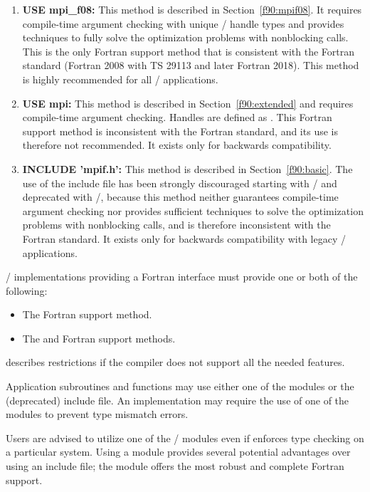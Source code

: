 \begin{enumerate}
\item\textbf{USE mpi\_f08:}
This method is described in Section~\ref{f90:mpif08}.
It requires compile-time argument checking
with unique \MPI/ handle types and provides techniques to fully solve
the optimization problems with nonblocking calls.
This is the only Fortran support method that is consistent with
the Fortran standard (Fortran 2008 with TS 29113 and later Fortran 2018).
This method is highly recommended for all \MPI/ applications.
\item\textbf{USE mpi:}
This method is
described in Section~\ref{f90:extended} and requires
compile-time argument checking. Handles are defined as .
This Fortran support method is inconsistent with the Fortran
standard, and its use is therefore not recommended.
It exists only for backwards compatibility.
\item\textbf{INCLUDE 'mpif.h':}
This method is described in Section~\ref{f90:basic}.
The use of the include file  has been strongly
discouraged starting with \MPIIIIDOTO/ and deprecated with \MPIIVDOTI/, because this method neither guarantees
compile-time argument checking nor provides sufficient techniques to solve
the optimization problems with nonblocking calls,
and is therefore inconsistent with the Fortran standard.
It exists only for backwards compatibility with legacy \MPI/ applications.
\end{enumerate}

\MPI/ implementations providing a Fortran interface
must provide
one or both of the following:
\begin{itemize}
\item The  Fortran support method.
\item The  and  Fortran support methods.
\end{itemize}
describes restrictions if the compiler does not support all the needed features.


Application subroutines and functions may use either
one of the modules or the
(deprecated)  include file. An implementation may
require the use of one of the modules
to prevent type mismatch errors.
\begin{users}
Users are advised to utilize one of the \MPI/ modules even if
 enforces type checking
on a particular system.
Using a module provides several
potential advantages over using an include file;
the  module offers the most robust and complete Fortran support.
\end{users}

